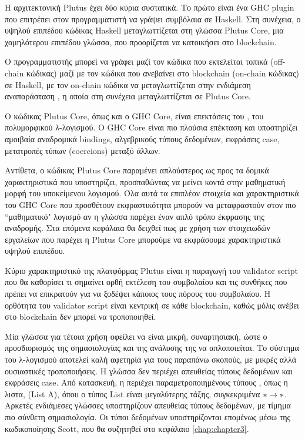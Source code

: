                              Η αρχιτεκτονική Plutus έχει δύο κύρια συστατικά. Το πρώτο είναι ένα GHC plugin που επιτρέπει στον
                             προγραμματιστή να γράψει συμβόλαια σε Haskell.  Στη συνέχεια, ο υψηλού επιπέδου κώδικας Haskell
                             μεταγλωττίζεται στη γλώσσα Plutus Core, μια χαμηλότερου επιπέδου γλώσσα, που προορίζεται να
                             κατοικήσει στο blockchain.


                               Ο προγραμματιστής 
                               μπορεί να γράφει μαζί τον κώδικα που εκτελείται τοπικά (off-chain κώδικας) μαζί με τον κώδικα που 
                                ανεβαίνει στο blockchain (on-chain κώδικας) σε Haskell, με τον on-chain κώδικα να μεταγλωττίζεται στην 
                                 ενδιάμεση αναπαράσταση \FIR{},  η οποία
                                  στη συνέχεια μεταγλωττίζεται σε Plutus Core. 
                                  
      
 Ο κώδικας Plutus Core, όπως και ο GHC Core, είναι επεκτάσεις του \FOM{}, του πολυμορφικού λ-λογισμού.
 Ο GHC Core είναι πιο πλούσια επέκταση και υποστηρίζει αμοιβαία αναδρομικά bindings, αλγεβρικούς
 τύπους δεδομένων, εκφράσεις case, μετατροπές τύπων (coercions) μεταξύ άλλων.
 
 Αντίθετα, ο κώδικας Plutus Core παραμένει απλούστερος ως προς τα δομικά χαρακτηριστικά που 
 υποστηρίζει, προσπαθώντας να μείνει κοντά στην μαθηματική μορφή του υποκείμενου λογισμού.
 Όλα αυτά τα επιπλέον στοιχεία και χαρακτηριστικά του GHC Core που προσθέτουν εκφραστικότητα 
 μπορούν να μεταφραστούν στον πιο ``μαθηματικό" λογισμό αν η γλώσσα παρέχει έναν απλό τρόπο
 έκφρασης της αναδρομής. Στα επόμενα κεφάλαια θα δειχθεί πως με χρήση των στοιχειωδών
 εργαλείων που παρέχει η Plutus Core μπορούμε να εκφράσουμε χαρακτηριστικά υψηλού επιπέδου.
                                  
            Κύριο χαρακτηριστικό της πλατφόρμας Plutus είναι η παραγωγή του validator script που θα 
            καθορίσει τι σημαίνει ορθή εκτέλεση του συμβολαίου και τις συνθήκες που πρέπει να επικρατούν
            για να ξοδέψει κάποιος τους πόρους του συμβολαίου. Η ορθότητα του validator script είναι 
            κεντρική σε κάθε blockchain, καθώς μόλις ανέβει στο blockchain δεν μπορεί να τροποποιηθεί.

Μία γλώσσα για τέτοια χρήση οφείλει να είναι μικρή, συναρτησιακή, ώστε ο προσδιορισμός της
σημασιολογίας και της ανάλυσης της να απλοποιείται. Το σύστημα του λ-λογισμού \FOM{} αποτελεί
καλή αφετηρία για τους παραπάνω σκοπούς, με μικρές αλλά ουσιαστικές τροποποιήσεις. Η γλώσσα
δεν περιέχει απευθείας τύπους δεδομένων και εκφράσεις case. Από κατασκευή, η \FOM{} περιέχει
παραμετροποιημένους τύπους , όπως η λιστα, (List A), όπου ο τύπος List είναι μεγαλύτερης τάξης,
συγκεκριμένα $\operatorname{\ast} \rightarrow \operatorname{\ast}$. Αρκετές ενδιάμεσες γλώσσες υποστηρίζουν απευθείας 
τύπους δεδομένων, με τίμημα πιο σύνθετη σημασιολογία. Οι τύποι δεδομένων υποστηρίζονται 
επομένως μέσω της κωδικοποίησης Scott, που θα συζητηθεί στο κεφάλαιο \ref{chap:chapter3}.

